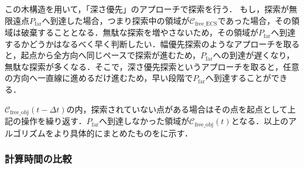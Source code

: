 \documentclass[a4paper,twoside,12pt,papersize, dvipdfmx]{iirthesis}
\begin{document}
この木構造を用いて，「深さ優先」のアプローチで探索を行う．
もし，探索が無限遠点$P_{\mathrm {far}}$へ到達した場合，つまり探索中の領域が$\mathcal{C}_{\mathrm{free\_ECS}}$であった場合，その領域は破棄することとなる．無駄な探索を増やさないため，その領域が$P_{\mathrm {far}}$へ到達するかどうかはなるべく早く判断したい．幅優先探索のようなアプローチを取ると，起点から全方向へ同じペースで探索が進むため，$P_{\mathrm {far}}$への到達が遅くなり，無駄な探索が多くなる．そこで，深さ優先探索というアプローチを取ると，任意の方向へ一直線に進めるだけ進むため，早い段階で$P_{\mathrm {far}}$へ到達することができる．\par

$\mathcal{C}_{\mathrm{free\_obj}}(t-\Delta t)$の内，探索されていない点がある場合はその点を起点として上記の操作を繰り返す．$P_{\mathrm {far}}$へ到達しなかった領域が$\mathcal{C}_{\mathrm{free\_obj}}(t)$となる．以上のアルゴリズムをより具体的にまとめたものをに示す．


\subsubsection{計算時間の比較}
\end{document}
